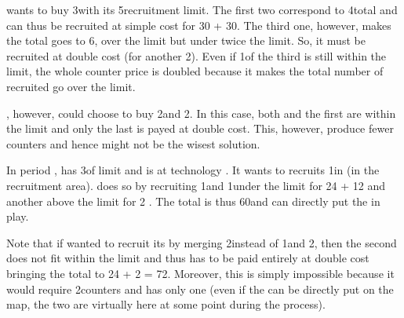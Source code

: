 \begin{exemple}
  \HIS wants to buy 3\ARMY\facemoins with its 5\LD recruitment limit.  The
  first two correspond to 4\LD total and can thus be recruited at simple cost
  for 30 + 30\ducats. The third one, however, makes the total goes to 6\LD,
  over the limit but under twice the limit. So, it must be recruited at double
  cost (for another 2\ducats). Even if 1\LD of the third
  \ARMY\facemoins is still within the limit, the whole counter price is
  doubled because it makes the total number of \LD recruited go over the
  limit.

  \HIS, however, could choose to buy 2\ARMY\facemoins and 2\LD. In this case,
  both \ARMY\facemoins and the first \LD are within the limit and only the
  last \LD is payed at double cost. This, however, produce fewer \ARMY
  counters and hence might not be the wisest solution.
\end{exemple}

\begin{exemple}
  In period , \POR has 3\LD of limit and is at technology \TREN. It
  wants to recruits 1\ARMY\Faceplus in \provinceTejo (in the recruitment
  area). \POR does so by recruiting 1\ARMY\Facemoins and 1\LD under the limit
  for 24 + 12 \ducats and another \LD above the limit for 2 \ducats. The total is thus 60\ducats and \POR can directly put the
  \ARMY\Faceplus in play.

  Note that if \POR wanted to recruit its \ARMY\Faceplus by merging
  2\ARMY\Facemoins instead of 1\ARMY\Facemoins and 2\LD, then the second
  \ARMY\Facemoins does not fit within the limit and thus has to be paid
  entirely at double cost bringing the total to 24 + 2  =
  72\ducats. Moreover, this is simply impossible because it would require
  2\ARMY counters and \POR has only one (even if the \ARMY\Faceplus can be
  directly put on the map, the two \ARMY\Facemoins are virtually here at some
  point during the process).
\end{exemple}


